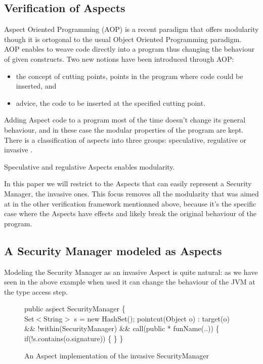\documentclass[draft]{llncs}
\begin{document}
\subsection{Verification of Aspects}
Aspect Oriented Programming (AOP) is a recent paradigm that offers modularity though it is ortogonal to 
the usual Object Oriented Programming paradigm. AOP enables to weave code directly into a program
thus changing the behaviour of given constructs. Two new notions have been introduced through AOP:
\begin{itemize}
\item the concept of cutting points, points in the program where code could be inserted, and
\item advice, the code to be inserted at the specified cutting point.
\end{itemize}
Adding Aspect code to a program most of the time doesn't change its general behaviour, and in these case
the modular properties of the program are kept.
There is a classification of aspects into three groups: speculative, regulative or invasive .

Speculative and regulative Aspects enables modularity. 


In this paper we will restrict to the Aspects that can easily represent a Security Manager, the invasive
ones. This focus removes all the modularity that was aimed at in the other verification framework
mentionned above,
because it's the specific case where the Aspects have effects and likely break the original behaviour of
the program.

\subsection{A Security Manager modeled as Aspects}
Modeling the Security Manager as an invasive Aspect is quite natural: as we have seen in the above example 
when used it can change the behaviour of the JVM at the type access step. 
%
\begin{figure}
\btab
public as\=pect SecurityManager \{\+\\

Set$<$String$>$ s = new HashSet();
pointcut(Object o) : target(o) \&\& !within(SecurityManager) \&\& call(public * funName(..)) \{
    if(!s.contains(o.signature)) \{
    \}
\}
  
\etab
\caption{An Aspect implementation of the invasive SecurityManager}
\end{figure}
\end{document}
